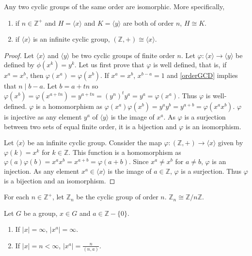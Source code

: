 \begin{theorem}
    Any two cyclic groups of the same order are isomorphic. More specifically,
    \begin{enumerate}
        \item if $n\in\mathbb{Z}^+$ and $H=\langle x\rangle$ and $K=\langle y\rangle$ are both of order $n$, $H\cong K$.
        \item if $\langle x\rangle$ is an infinite cyclic group, $(\mathbb{Z},+)\cong\langle x\rangle$.
    \end{enumerate}
\end{theorem}
\begin{proof}
Let $\langle x\rangle$ and $\langle y\rangle$ be two cyclic groups of finite order $n$. Let $\varphi:\langle x\rangle\to\langle y\rangle$ be defined by $\phi(x^k)=y^k$. Let us first prove that $\varphi$ is well defined, that is, if $x^a=x^b$, then $\varphi(x^a)=\varphi(x^b)$. If $x^a=x^b$, $x^{b-a}=1$ and \ref{orderGCD} implies that $n\mid b-a$. Let $b=a+tn$ so
$\varphi(x^b)=\varphi(x^{a+tn})=y^{a+tn}=(y^n)^ty^a=y^a=\varphi(x^a)$. Thus $\varphi$ is well-defined. $\varphi$ is a homomorphism as $\varphi(x^a)\varphi(x^b)=y^ay^b=y^{a+b}=\varphi(x^ax^b)$. $\varphi$ is injective as any element $y^a$ of $\langle y\rangle$ is the image of $x^a$. As $\varphi$ is a surjection between two sets of equal finite order, it is a bijection and $\varphi$ is an isomorphism.

\vspace{2mm}
Let $\langle x\rangle$ be an infinite cyclic group. Consider the map $\varphi:(\mathbb{Z},+)\to\langle x\rangle$ given by $\varphi(k)=x^k$ for $k\in\mathbb{Z}$. This function is a homomorphism as $\varphi(a)\varphi(b)=x^ax^b=x^{a+b}=\varphi(a+b)$. Since $x^a\neq x^b$ for $a\neq b$, $\varphi$ is an injection. As any element $x^a\in\langle x\rangle$ is the image of $a\in\mathbb{Z}$, $\varphi$ is a surjection. Thus $\varphi$ is a bijection and an isomorphism.
\end{proof}

For each $n\in\mathbb{Z}^+$, let $\mathbb{Z}_n$ be the cyclic group of order $n$. $\mathbb{Z}_n\cong\mathbb{Z}/n\mathbb{Z}$.

\begin{theorem}
\label{orderIsOrderByGCD}
    Let $G$ be a group, $x\in G$ and $a\in\mathbb{Z}-\{0\}$.
    \begin{enumerate}
        \item If $|x|=\infty$, $|x^a|=\infty$.
        \item If $|x|=n<\infty$, $|x^a|=\frac{n}{(n,a)}$.
    \end{enumerate}
\end{theorem}

